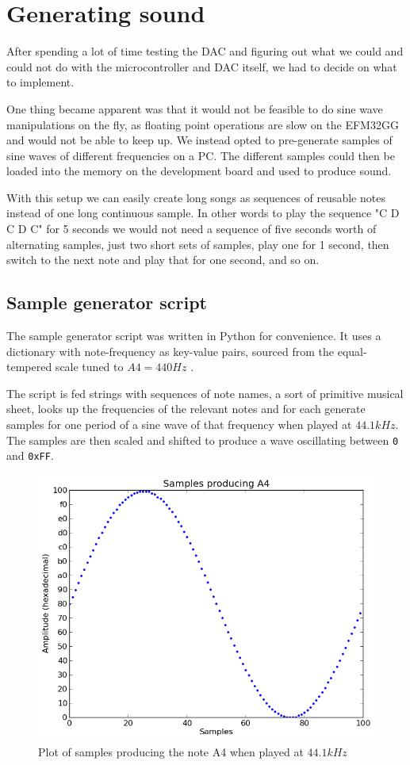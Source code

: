 \section{Generating sound}
After spending a lot of time testing the DAC and figuring out what we could and could not do with the microcontroller and DAC itself, we had to decide on what to implement.

One thing became apparent was that it would not be feasible to do sine wave manipulations on the fly, as floating point operations are slow on the EFM32GG and would not be able to keep up. We instead opted to pre-generate samples of sine waves of different frequencies on a PC. The different samples could then be loaded into the memory on the development board and used to produce sound.

With this setup we can easily create long songs as sequences of reusable notes instead of one long continuous sample. In other words to play the sequence "C D C D C" for 5 seconds we would not need a sequence of five seconds worth of alternating samples, just two short sets of samples, play one for 1 second, then switch to the next note and play that for one second, and so on.

\subsection{Sample generator script}
The sample generator script was written in Python for convenience. It uses a dictionary with note-frequency as key-value pairs, sourced from the equal-tempered scale tuned to $A4 = 440Hz$ \cite{notefreqs}.

The script is fed strings with sequences of note names, a sort of primitive musical sheet, looks up the frequencies of the relevant notes and for each generate samples for one period of a sine wave of that frequency when played at $44.1kHz$. The samples are then scaled and shifted to produce a wave oscillating between \texttt{0} and \texttt{0xFF}.

\begin{figure}[h!]
\includegraphics[width=\linewidth]{img/A4.png}
\caption{Plot of samples producing the note A4 when played at $44.1kHz$}
\label{fig:A4samples}
\end{figure}

